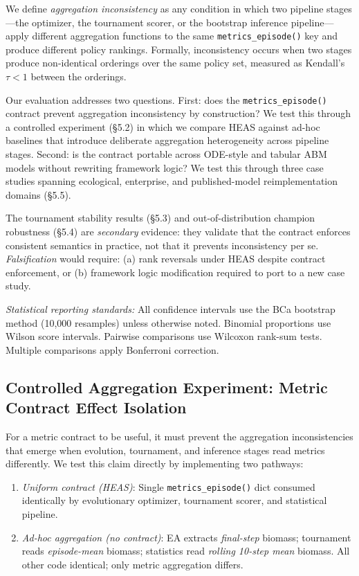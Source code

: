 \documentclass{wscpaperproc}
\begin{document}
We define \emph{aggregation inconsistency} as any condition in which two pipeline
stages---the optimizer, the tournament scorer, or the bootstrap inference
pipeline---apply different aggregation functions to the same
\texttt{metrics\_episode()} key and produce different policy rankings. Formally,
inconsistency occurs when two stages produce non-identical orderings over the
same policy set, measured as Kendall's~$\tau < 1$ between the orderings.

Our evaluation addresses two questions. First: does the \texttt{metrics\_episode()}
contract prevent aggregation inconsistency by construction? We test this through
a controlled experiment (\S5.2) in which we compare HEAS
against ad-hoc baselines that introduce deliberate aggregation heterogeneity across
pipeline stages. Second: is the contract portable across ODE-style and tabular
ABM models without rewriting framework logic? We test this through three case
studies spanning ecological, enterprise, and published-model reimplementation
domains (\S5.5).

The tournament stability results (\S5.3) and out-of-distribution
champion robustness (\S5.4) are \emph{secondary} evidence: they
validate that the contract enforces consistent semantics in practice, not that
it prevents inconsistency per se. \emph{Falsification} would require: (a) rank
reversals under HEAS despite contract enforcement, or (b) framework logic
modification required to port to a new case study.

\emph{Statistical reporting standards:} All confidence intervals use the BCa
bootstrap method (10,000 resamples) unless otherwise noted. Binomial proportions
use Wilson score intervals. Pairwise comparisons use Wilcoxon rank-sum tests.
Multiple comparisons apply Bonferroni correction.


\subsection{Controlled Aggregation Experiment: Metric Contract Effect Isolation}
\label{sec:controlled-agg}

For a metric contract to be useful, it must prevent the aggregation inconsistencies
that emerge when evolution, tournament, and inference stages read metrics differently.
We test this claim directly by implementing two pathways:

\begin{enumerate}
\item \emph{Uniform contract (HEAS)}: Single \texttt{metrics\_episode()} dict consumed
identically by evolutionary optimizer, tournament scorer, and statistical pipeline.
\item \emph{Ad-hoc aggregation (no contract)}: EA extracts \emph{final-step} biomass;
tournament reads \emph{episode-mean} biomass; statistics read \emph{rolling 10-step mean}
biomass. All other code identical; only metric aggregation differs.
\end{enumerate}
\end{document}
